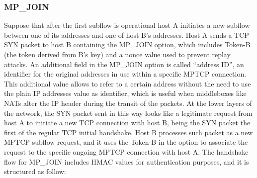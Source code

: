\subsubsection{MP\_JOIN}
Suppose that after the first subflow is operational host A initiates a new subflow between one of its addresses and one of host B's addresses. Host A sends a TCP SYN packet to host B containing the MP\_JOIN option, which includes Token-B (the token derived from B's key) and a nonce value used to prevent replay attacks. An additional field in the MP\_JOIN option is called ``address ID'', an identifier for the original addresses in use within a specific MPTCP connection. This additional value allows to refer to a certain address without the need to use the plain IP addresses value as identifier, which is useful when middleboxes like NATs alter the IP header during the transit of the packets.
At the lower layers of the network, the SYN packet sent in this way looks like a legitimate request from host A to initiate a new TCP connection with host B, being the SYN packet the first of the regular TCP initial handshake. Host B processes such packet as a new MPTCP subflow request, and it uses the Token-B in the option to associate the request to the specific ongoing MPTCP connection with host A. The handshake flow for MP\_JOIN includes HMAC values for authentication purposes, and it is structured as follow:
